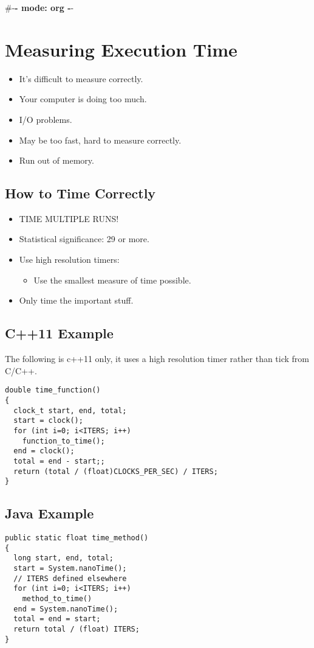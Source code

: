 \documentclass[11pt]{article}
\author{davec}
\date{\today}
\title{}
\begin{document}
\tableofcontents

\#-\textbf{- mode: org -}-

\section{Measuring Execution Time}
\label{sec:org1cc0d1f}
\begin{itemize}
\item It's difficult to measure correctly.
\item Your computer is doing too much.
\item I/O problems.
\item May be too fast, hard to measure correctly.
\item Run out of memory.
\end{itemize}
\subsection{How to Time Correctly}
\label{sec:orgcb4b08e}
\begin{itemize}
\item TIME MULTIPLE RUNS!
\item Statistical significance: 29 or more.
\item Use high resolution timers:
\begin{itemize}
\item Use the smallest measure of time possible.
\end{itemize}
\item Only time the important stuff.
\end{itemize}
\subsection{C++11 Example}
\label{sec:orgd54d1d1}
The following is c++11 only, it uses a high resolution timer rather than tick
from C/C++.
\begin{verbatim}
double time_function()
{
  clock_t start, end, total;
  start = clock();
  for (int i=0; i<ITERS; i++)
    function_to_time();
  end = clock();
  total = end - start;;
  return (total / (float)CLOCKS_PER_SEC) / ITERS;
}
\end{verbatim}

\subsection{Java Example}
\label{sec:org1c70a6c}
\begin{verbatim}
public static float time_method()
{
  long start, end, total;
  start = System.nanoTime();
  // ITERS defined elsewhere
  for (int i=0; i<ITERS; i++)
    method_to_time()
  end = System.nanoTime();
  total = end = start;
  return total / (float) ITERS;
}
\end{verbatim}
\end{document}
